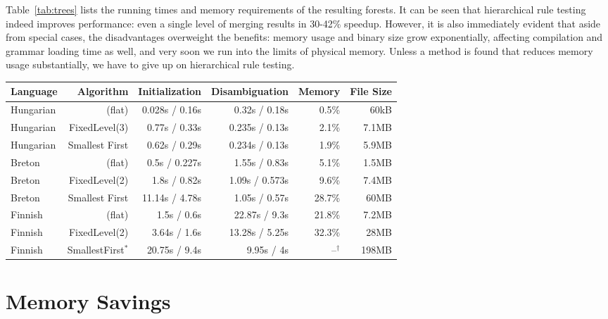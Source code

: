 \documentclass[11pt]{article}
\begin{document}
Table~\ref{tab:trees} lists the running times and memory requirements of the
resulting forests. It can be seen that hierarchical rule testing
indeed improves performance: even a single level of merging results in 30-42\%
speedup. However, it is also immediately evident that aside from special cases,
the disadvantages overweight the benefits: memory usage and binary size grow
exponentially, affecting compilation and grammar loading time as well, and very
soon we run into the limits of physical memory. Unless a method is found that
reduces memory usage substantially, we have to give up on hierarchical rule
testing.

\begin{table*}[h]
  \centering
  \caption{Performance and storage requirements of rule testing trees\\
           $^\ast$ State count limit was 500\hspace{3em}
           $^\dagger$ Did not fit into memory}
  \label{tab:trees}
  \begin{tabular}{ | l | r | r | r | r | r | }
  \hline
  \textbf{Language} & \textbf{Algorithm} & \textbf{Initialization} &
  \textbf{Disambiguation} & \textbf{Memory} & \textbf{File Size} \\
  \hline
  Hungarian & (flat) & 0.028s / 0.16s & 0.32s / 0.18s & 0.5\% & 60kB \\
  Hungarian & FixedLevel(3) & 0.77s / 0.33s & 0.235s / 0.13s & 2.1\% & 7.1MB \\
  Hungarian & Smallest First & 0.62s / 0.29s & 0.234s / 0.13s & 1.9\% & 5.9MB \\
  Breton    & (flat) & 0.5s / 0.227s & 1.55s / 0.83s & 5.1\% & 1.5MB \\
  Breton    & FixedLevel(2) & 1.8s / 0.82s & 1.09s / 0.573s & 9.6\% & 7.4MB \\
  Breton    & Smallest First & 11.14s / 4.78s & 1.05s / 0.57s & 28.7\% & 60MB \\
  Finnish   & (flat) & 1.5s / 0.6s & 22.87s / 9.3s & 21.8\% & 7.2MB \\
  Finnish   & FixedLevel(2) & 3.64s / 1.6s & 13.28s / 5.25s & 32.3\% & 28MB \\
  Finnish   & SmallestFirst$^\ast$ & 20.75s / 9.4s & 9.95s / 4s & --$^\dagger$ & 198MB \\
  \hline
  \end{tabular}
\end{table*}

\section{Memory Savings}
\label{sec:memory}
\end{document}
